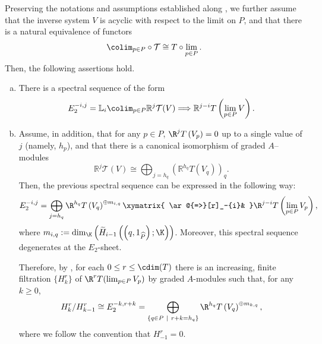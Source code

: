 \documentclass[11pt]{amsart}
\begin{document}
\begin{teo}
Preserving the notations and assumptions established along , we further assume that the inverse
system $V$ is acyclic with respect to the limit on $P$, and that there is a natural equivalence of functors
\[
\colim_{p\in P}\circ\mathcal{T}\cong T\circ\lim_{p\in P}.
\]
Then, the following assertions hold.

\begin{enumerate}[(a)]

\item There is a spectral sequence of the form
\[
E_2^{-i,j}=\mathbb{L}_i \colim_{p\in P} \mathbb{R}^j \mathcal{T} (V)\Longrightarrow \mathbb{R}^{j-i} T\left(\lim_{p\in P} V\right).
\]

\item Assume, in addition, that for any $p\in P$, $\R^j T \left(V_p\right)=0$ up to a single value of $j$ (namely, $h_p$), and that there is a canonical isomorphism of graded $A$--modules
\[
\mathbb{R}^j \mathcal{T} (V)\cong\bigoplus_{j=h_q} \left(\mathbb{R}^{h_q} T (V_q)\right)_q.
\]
Then, the previous spectral sequence can be expressed in the following way:
\[
E_2^{-i,j}=\bigoplus_{j=h_q} \R^{h_q} T \left(V_q\right)^{\oplus m_{i,q}}\xymatrix{ \ar@{=>}[r]_-{i}& }\R^{j-i}T \left(\lim_{p\in P}V_p\right),
\]
where $m_{i,q}:=\dim_{\K} \left(\widetilde{H}_{i-1} \left(\left(q,1_{\widehat{P}}\right);\K\right)\right)$. Moreover,
this spectral sequence degenerates at the $E_2$-sheet.

Therefore, by \cite[5.2.5]{Weibel1994}, for each
$0\leq r\leq\cdim (T)$ there is an increasing, finite filtration $\{H_k^r\}$ of $\R^r T(\lim_{p\in P}V_p)$ by graded
$A$-modules such that, for any $k\geq 0$,
\[
H_k^r/H_{k-1}^r\cong E_2^{-k,r+k}=\bigoplus_{\{q\in P\ \mid\ r+k=h_q\}} \R^{h_q} T \left(V_q\right)^{\oplus m_{k,q}},
\]
where we follow the convention that $H_{-1}^r =0$.

\end{enumerate}
\end{teo}
\end{document}
